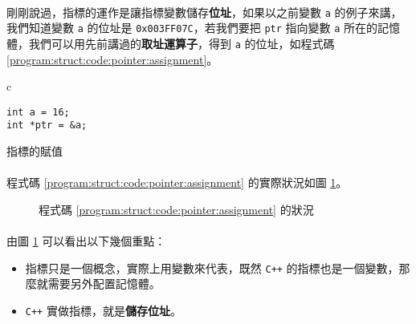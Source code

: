\documentclass[12pt,a4paper,oneside]{report}
\begin{document}
\begin{CJK}{UTF8}{bkai}
\paragraph{}剛剛說過，指標的運作是讓指標變數儲存\textbf{位址}，如果以之前變數 \lstinline!a! 的例子來講，我們知道變數 \lstinline!a! 的位址是 \texttt{0x003FF07C}，若我們要把 \lstinline!ptr! 指向變數 \lstinline!a! 所在的記憶體，我們可以用先前講過的\textbf{取址運算子}，得到 \lstinline!a! 的位址，如程式碼 \ref{program:struct:code:pointer:assignment}。

\begin{code}[h!]
\centering
\begin{tabular}{c}
\begin{lstlisting}
int a = 16;
int *ptr = &a;
\end{lstlisting}
\end{tabular}
\caption{指標的賦值}
\label{program:struct:code:pointer:assignment}
\end{code}

\paragraph{}程式碼 \ref{program:struct:code:pointer:assignment} 的實際狀況如圖 \ref{program:struct:fig:pointer:assignment}。

\begin{figure}[h!]
\centering
{}
\caption{程式碼 \ref{program:struct:code:pointer:assignment} 的狀況}
\label{program:struct:fig:pointer:assignment}
\end{figure}

\paragraph{}由圖 \ref{program:struct:fig:pointer:assignment} 可以看出以下幾個重點：
\begin{itemize}
\item 指標只是一個概念，實際上用變數來代表，既然 \texttt{C++} 的指標也是一個變數，那麼就需要另外配置記憶體。
\item \texttt{C++} 實做指標，就是{\color{blue}\textbf{儲存位址}}。
\end{itemize}


\end{CJK}
\end{document}

